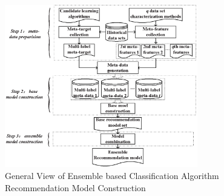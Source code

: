 \documentclass[prodmode,acmtkdd]{acmsmall}
\begin{document}
\begin{figure}
    \centering
    \includegraphics[width=0.75\textwidth]{Figures/MethodGeneralView3}
    \caption{General View of Ensemble based Classification Algorithm Recommendation Model Construction}\label{Fig:ModelConstructProcess}
\end{figure}
\end{document}
